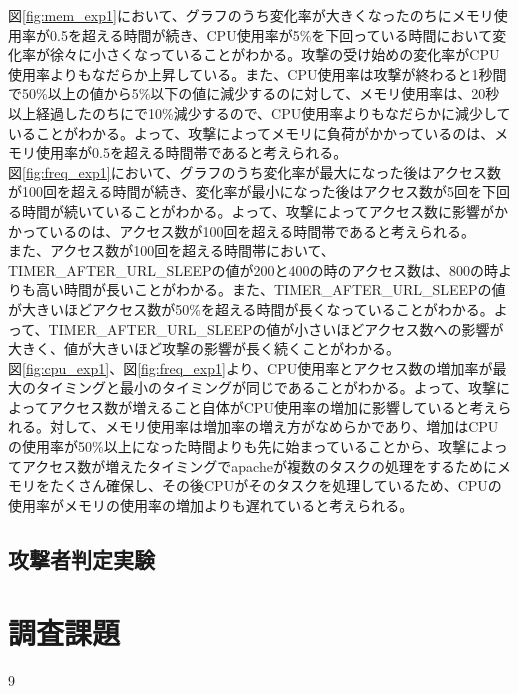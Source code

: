 \documentclass[dvipdfmx]{jsarticle}
\begin{document}
図\ref{fig:mem_exp1}において、グラフのうち変化率が大きくなったのちにメモリ使用率が0.5を超える時間が続き、CPU使用率が5\%を下回っている時間において変化率が徐々に小さくなっていることがわかる。攻撃の受け始めの変化率がCPU使用率よりもなだらか上昇している。また、CPU使用率は攻撃が終わると1秒間で50\%以上の値から5\%以下の値に減少するのに対して、メモリ使用率は、20秒以上経過したのちにで10\%減少するので、CPU使用率よりもなだらかに減少していることがわかる。よって、攻撃によってメモリに負荷がかかっているのは、メモリ使用率が0.5を超える時間帯であると考えられる。\\

図\ref{fig:freq_exp1}において、グラフのうち変化率が最大になった後はアクセス数が100回を超える時間が続き、変化率が最小になった後はアクセス数が5回を下回る時間が続いていることがわかる。よって、攻撃によってアクセス数に影響がかかっているのは、アクセス数が100回を超える時間帯であると考えられる。\\
また、アクセス数が100回を超える時間帯において、TIMER\_AFTER\_URL\_SLEEPの値が200と400の時のアクセス数は、800の時よりも高い時間が長いことがわかる。また、TIMER\_AFTER\_URL\_SLEEPの値が大きいほどアクセス数が50\%を超える時間が長くなっていることがわかる。よって、TIMER\_AFTER\_URL\_SLEEPの値が小さいほどアクセス数への影響が大きく、値が大きいほど攻撃の影響が長く続くことがわかる。\\

図\ref{fig:cpu_exp1}、図\ref{fig:freq_exp1}より、CPU使用率とアクセス数の増加率が最大のタイミングと最小のタイミングが同じであることがわかる。よって、攻撃によってアクセス数が増えること自体がCPU使用率の増加に影響していると考えられる。対して、メモリ使用率は増加率の増え方がなめらかであり、増加はCPUの使用率が50\%以上になった時間よりも先に始まっていることから、攻撃によってアクセス数が増えたタイミングでapacheが複数のタスクの処理をするためにメモリをたくさん確保し、その後CPUがそのタスクを処理しているため、CPUの使用率がメモリの使用率の増加よりも遅れていると考えられる。





\subsection{攻撃者判定実験}

\section{調査課題}


\pagebreak
\begin{thebibliography}{9}
\end{thebibliography}
\end{document}
